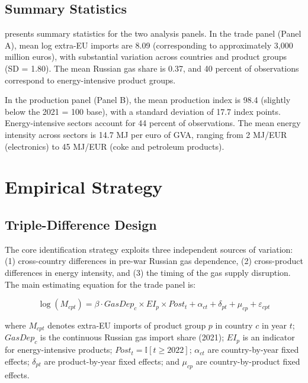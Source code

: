 \documentclass[12pt]{article}
\newcommand{\ind}{\mathbb{I}}
\begin{document}
\subsection{Summary Statistics}

 presents summary statistics for the two analysis panels. In the trade panel (Panel A), mean log extra-EU imports are 8.09 (corresponding to approximately 3,000 million euros), with substantial variation across countries and product groups (SD = 1.80). The mean Russian gas share is 0.37, and 40 percent of observations correspond to energy-intensive product groups.

In the production panel (Panel B), the mean production index is 98.4 (slightly below the 2021 = 100 base), with a standard deviation of 17.7 index points. Energy-intensive sectors account for 44 percent of observations. The mean energy intensity across sectors is 14.7 MJ per euro of GVA, ranging from 2 MJ/EUR (electronics) to 45 MJ/EUR (coke and petroleum products).




\section{Empirical Strategy}
\label{sec:empirical}

\subsection{Triple-Difference Design}

The core identification strategy exploits three independent sources of variation: (1) cross-country differences in pre-war Russian gas dependence, (2) cross-product differences in energy intensity, and (3) the timing of the gas supply disruption. The main estimating equation for the trade panel is:

\begin{equation}
\log(M_{cpt}) = \beta \cdot GasDep_c \times EI_p \times Post_t + \alpha_{ct} + \delta_{pt} + \mu_{cp} + \varepsilon_{cpt}
\label{eq:triple_did}
\end{equation}

\noindent where $M_{cpt}$ denotes extra-EU imports of product group $p$ in country $c$ in year $t$; $GasDep_c$ is the continuous Russian gas import share (2021); $EI_p$ is an indicator for energy-intensive products; $Post_t = \ind[t \geq 2022]$; $\alpha_{ct}$ are country-by-year fixed effects; $\delta_{pt}$ are product-by-year fixed effects; and $\mu_{cp}$ are country-by-product fixed effects.
\end{document}
